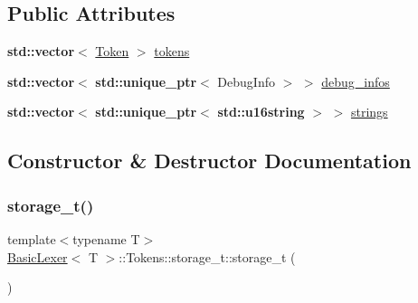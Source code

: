 \subsection*{Public Attributes}
\begin{DoxyCompactItemize}
\item 
\textbf{ std\+::vector}$<$ \hyperlink{class_token}{Token} $>$ \hyperlink{struct_basic_lexer_1_1_tokens_1_1storage__t_a5150826387fcf46d98647a4d4e3fc83f}{tokens}
\item 
\textbf{ std\+::vector}$<$ \textbf{ std\+::unique\+\_\+ptr}$<$ Debug\+Info $>$ $>$ \hyperlink{struct_basic_lexer_1_1_tokens_1_1storage__t_ae3ce5c349aac790b12113d269d974f34}{debug\+\_\+infos}
\item 
\textbf{ std\+::vector}$<$ \textbf{ std\+::unique\+\_\+ptr}$<$ \textbf{ std\+::u16string} $>$ $>$ \hyperlink{struct_basic_lexer_1_1_tokens_1_1storage__t_aab6e51d3081a09fbfae5e6d830d0a02d}{strings}
\end{DoxyCompactItemize}


\subsection{Constructor \& Destructor Documentation}
\mbox{\label{struct_basic_lexer_1_1_tokens_1_1storage__t_a93eb78f3f158d806a2c02934bbdea859}} 
\subsubsection{\texorpdfstring{storage\+\_\+t()}{storage\_t()}\hspace{0.1cm}{\footnotesize\ttfamily [1/2]}}
{\footnotesize\ttfamily template$<$typename T$>$ \\
\hyperlink{class_basic_lexer}{Basic\+Lexer}$<$ T $>$\+::Tokens\+::storage\+\_\+t\+::storage\+\_\+t (\begin{DoxyParamCaption}{ }\end{DoxyParamCaption})\hspace{0.3cm}{\ttfamily [inline]}}

\mbox{\label{struct_basic_lexer_1_1_tokens_1_1storage__t_adc2ef25135af9c48c8694187fa39f527}} 
